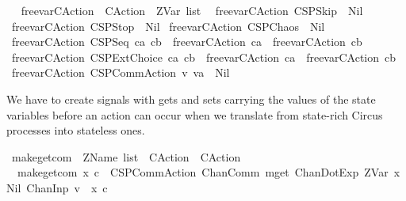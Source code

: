 \begin{isabellebody}
\ \isanewline
{}\isamarkupfalse%
\ free{\isacharunderscore}var{\isacharunderscore}CAction\ {\isacharcolon}{\isacharcolon}\ {\isachardoublequoteopen}CAction\ {\isasymRightarrow}\ ZVar\ list{\isachardoublequoteclose}\isanewline
{}\isanewline
\ \ {\isachardoublequoteopen}free{\isacharunderscore}var{\isacharunderscore}CAction\ CSPSkip\ {\isacharequal}\ Nil{\isachardoublequoteclose}\isanewline
{\isacharbar}\ {\isachardoublequoteopen}free{\isacharunderscore}var{\isacharunderscore}CAction\ CSPStop\ {\isacharequal}\ Nil{\isachardoublequoteclose}\isanewline
{\isacharbar}\ {\isachardoublequoteopen}free{\isacharunderscore}var{\isacharunderscore}CAction\ CSPChaos\ {\isacharequal}\ Nil{\isachardoublequoteclose}\isanewline
{\isacharbar}\ {\isachardoublequoteopen}free{\isacharunderscore}var{\isacharunderscore}CAction\ {\isacharparenleft}CSPSeq\ ca\ cb{\isacharparenright}\ {\isacharequal}\ {\isacharparenleft}{\isacharparenleft}free{\isacharunderscore}var{\isacharunderscore}CAction\ ca{\isacharparenright}\ {\isacharat}\ {\isacharparenleft}free{\isacharunderscore}var{\isacharunderscore}CAction\ cb{\isacharparenright}{\isacharparenright}{\isachardoublequoteclose}\isanewline
{\isacharbar}\ {\isachardoublequoteopen}free{\isacharunderscore}var{\isacharunderscore}CAction\ {\isacharparenleft}CSPExtChoice\ ca\ cb{\isacharparenright}\ {\isacharequal}\ {\isacharparenleft}{\isacharparenleft}free{\isacharunderscore}var{\isacharunderscore}CAction\ ca{\isacharparenright}\ {\isacharat}\ {\isacharparenleft}free{\isacharunderscore}var{\isacharunderscore}CAction\ cb{\isacharparenright}{\isacharparenright}{\isachardoublequoteclose}\isanewline
{\isacharbar}\ {\isachardoublequoteopen}free{\isacharunderscore}var{\isacharunderscore}CAction\ {\isacharparenleft}CSPCommAction\ v\ va{\isacharparenright}\ {\isacharequal}\ Nil{\isachardoublequoteclose}%
\isamarkuptrue%
%
\begin{isamarkuptext}%
We have to create signals with gets and sets carrying the values of the state variables
before an action can occur when we translate from state-rich Circus processes into stateless ones.%
\end{isamarkuptext}%
\isamarkuptrue%
\isamarkupfalse%
\ make{\isacharunderscore}get{\isacharunderscore}com\ {\isacharcolon}{\isacharcolon}\ {\isachardoublequoteopen}ZName\ list\ {\isasymRightarrow}\ CAction\ {\isasymRightarrow}\ CAction{\isachardoublequoteclose}\isanewline
{}\isanewline
\ \ {\isachardoublequoteopen}make{\isacharunderscore}get{\isacharunderscore}com\ {\isacharbrackleft}x{\isacharbrackright}\ c\ {\isacharequal}\ {\isacharparenleft}CSPCommAction\ {\isacharparenleft}ChanComm\ {\isacharprime}{\isacharprime}mget{\isacharprime}{\isacharprime}\ {\isacharbrackleft}ChanDotExp\ {\isacharparenleft}ZVar\ {\isacharparenleft}x{\isacharcomma}\ Nil{\isacharparenright}{\isacharparenright}{\isacharcomma}\ ChanInp\ {\isacharparenleft}{\isacharprime}{\isacharprime}v{\isacharunderscore}{\isacharprime}{\isacharprime}\ {\isacharat}\ x{\isacharparenright}{\isacharbrackright}{\isacharparenright}\ c{\isacharparenright}{\isachardoublequoteclose}\isanewline

\end{isabellebody}
